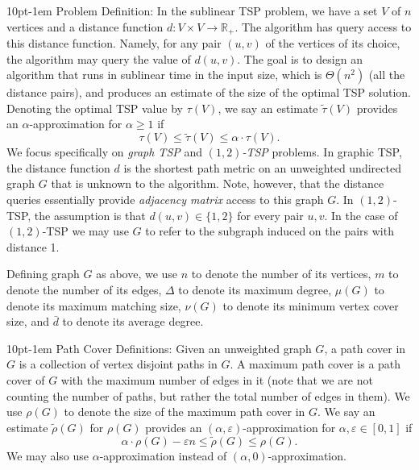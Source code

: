\documentclass[letterpaper,11pt]{article}
\makeatletter
\renewcommand{\epsilon}{\varepsilon}
\newcommand{\tspsize}[1]{\ensuremath{\tau}(#1)}
\newcommand{\pathcoversize}[1]{\ensuremath{\rho}(#1)}
\renewcommand{\paragraph}{%
  \@startsection{paragraph}{4}%
  {\z@}{10pt}{-1em}%
  {\normalfont\normalsize\bfseries}%
}
\makeatother
\begin{document}
\paragraph{Problem Definition:} In the sublinear TSP problem, we have a set $V$ of $n$ vertices and a distance function $d: V \times V \to \mathbb{R}_+$. The algorithm has query access to this distance function. Namely, for any pair $(u, v)$ of the vertices of its choice, the algorithm may query the value of $d(u, v)$. The goal is to design an algorithm that runs in sublinear time in the input size, which is $\Theta(n^2)$ (all the distance pairs), and produces an estimate of the size of the optimal TSP solution. Denoting the optimal TSP value by $\tspsize{V}$, we say an estimate $\widetilde{\tau}(V)$ provides an $\alpha$-approximation for $\alpha \geq 1$ if
$$
    \tspsize{V} \leq \widetilde{\tau}(V) \leq \alpha \cdot \tspsize{V}.
$$
We focus specifically on {\em graph TSP} and {\em $(1,2)$-TSP} problems. In graphic TSP, the distance function $d$ is the shortest path metric on an unweighted undirected graph $G$ that is unknown to the algorithm. Note, however, that the distance queries essentially provide {\em adjacency matrix} access to this graph $G$. In $(1,2)$-TSP, the assumption is that $d(u, v) \in \{1,2\}$ for every pair $u, v$. In the case of $(1,2)$-TSP we may use $G$ to refer to the subgraph induced on the pairs with distance 1.

Defining graph $G$ as above, we use $n$ to denote the number of its vertices, $m$ to denote the number of its edges, $\Delta$ to denote its maximum degree, $\mu(G)$ to denote its maximum matching size, $\nu(G)$ to denote its minimum vertex cover size, and $\bar{d}$ to denote its average degree.

\paragraph{Path Cover Definitions:} Given an unweighted graph $G$, a path cover in $G$ is a collection of vertex disjoint paths in $G$. A maximum path cover is a path cover of $G$ with the maximum number of edges in it (note that we are not counting the number of paths, but rather the total number of edges in them). We use $\pathcoversize{G}$ to denote the size of the maximum path cover in $G$. We say an estimate $\widetilde{\rho}(G)$ for $\pathcoversize{G}$ provides an $(\alpha, \epsilon)$-approximation for $\alpha, \epsilon \in [0, 1]$ if
$$
    \alpha \cdot \pathcoversize{G} - \epsilon n \leq \widetilde{\rho}(G) \leq \pathcoversize{G}.
$$
We may also use $\alpha$-approximation instead of $(\alpha, 0)$-approximation.
\end{document}
